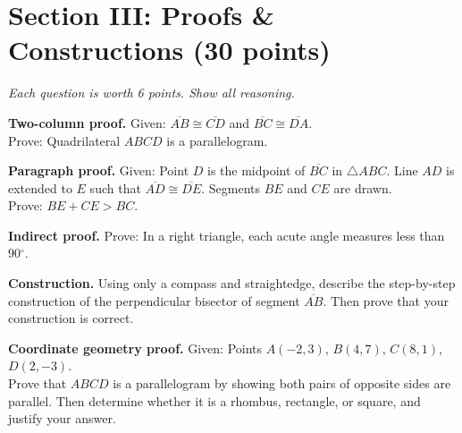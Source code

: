 \documentclass[12pt,addpoints]{exam}
\newcommand{\deg}{{}^\circ}
\begin{document}
\newpage

\section*{Section III: Proofs \& Constructions \hfill (30 points)}
\noindent\textit{Each question is worth 6 points. Show all reasoning.}

\begin{questions}

\question \textbf{Two-column proof.} Given: $\overline{AB} \cong \overline{CD}$ and $\overline{BC} \cong \overline{DA}$.\\
Prove: Quadrilateral $ABCD$ is a parallelogram.

\vspace{3cm}

\question \textbf{Paragraph proof.} Given: Point $D$ is the midpoint of $\overline{BC}$ in $\triangle ABC$. Line $AD$ is extended to $E$ such that $\overline{AD} \cong \overline{DE}$. Segments $BE$ and $CE$ are drawn.\\
Prove: $BE + CE > BC$.

\vspace{3cm}

\question \textbf{Indirect proof.} Prove: In a right triangle, each acute angle measures less than $90\deg$.

\vspace{3cm}

\question \textbf{Construction.} Using only a compass and straightedge, describe the step-by-step construction of the perpendicular bisector of segment $\overline{AB}$. Then prove that your construction is correct.

\vspace{3cm}

\question \textbf{Coordinate geometry proof.} Given: Points $A(-2, 3)$, $B(4, 7)$, $C(8, 1)$, $D(2, -3)$.\\
Prove that $ABCD$ is a parallelogram by showing both pairs of opposite sides are parallel. Then determine whether it is a rhombus, rectangle, or square, and justify your answer.

\vspace{3cm}

\end{questions}

\newpage
\end{document}
